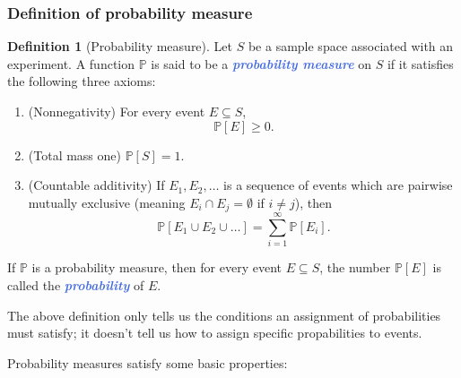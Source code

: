 \documentclass[10pt]{article}
\theoremstyle{definition}
\newtheorem{definition}[theorem]{Definition}
\newcommand{\1}[1]{\textbf{1}_{\left[#1\right]}} %
\def\P{\mathbb{P}} %
\newcommand{\demph}[1]{\textcolor{RoyalBlue}{\textbf{\slshape #1}}} %
\begin{document}
\subsubsection{Definition of probability measure}
\begin{definition}[Probability measure] 
  Let $S$ be a sample space associated with an experiment. A function $\P$ is
  said to be a \demph{probability measure} on $S$ if it satisfies the
  following three axioms:
  \begin{enumerate}[label=\textbf{A.\arabic*}]
    \item (Nonnegativity) \label{item:probability-axiom-nonnegativity} For
    every event $E\subseteq S$,
    \begin{equation*}
      \P\left[E\right] \geq 0.
    \end{equation*}
    \item (Total mass one) $\P\left[S \right] =1$.
    \item (Countable additivity) If $E_{1},E_{2},\ldots$ is a sequence of
    events which are pairwise mutually exclusive (meaning
    $E_{i}\cap E_{j}=\emptyset$ if $i\neq j$), then
    \begin{equation*}
      \P\left[E_{1}\cup E_{2}\cup \ldots \right] = \sum_{i=1}^{\infty} \P\left[E_{i} \right].
    \end{equation*}
  \end{enumerate}
  If $\P$ is a probability measure, then for every event $E\subseteq S$, the
  number $\P\left[E \right]$ is called the \demph{probability} of $E$.
\end{definition}

The above definition only tells us the conditions an assignment of
probabilities must satisfy; it doesn't tell us how to assign specific
propabilities to events.

Probability measures satisfy some basic properties:
\end{document}
